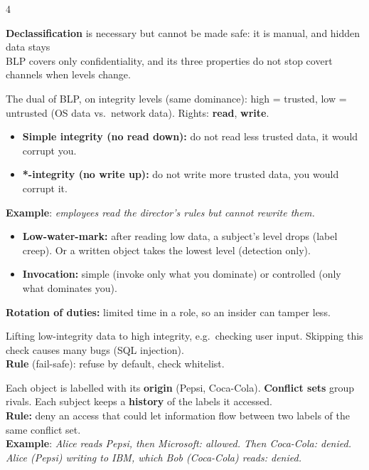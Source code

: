 \documentclass[8pt,a4paper,landscape]{extarticle}
\begin{document}
\begin{multicols*}{4}
\begin{warn}[title=Declassification and BLP limits]
    \textbf{Declassification} is necessary but cannot be made safe: it is manual, and hidden data stays\\
    BLP covers only confidentiality, and its three properties do not stop covert channels when levels change.
\end{warn}

\begin{prop}[title=Model 2 - BIBA: integrity]
    The dual of BLP, on integrity levels (same dominance): high = trusted, low = untrusted (OS data vs.\ network data). Rights: \textbf{read}, \textbf{write}.
\end{prop}

\begin{thm}[title=BIBA properties]
    \begin{itemize}
        \item \textbf{Simple integrity (no read down):} do not read less trusted data, it would corrupt you.
        \item \textbf{*-integrity (no write up):} do not write more trusted data, you would corrupt it.
    \end{itemize}
    \textbf{Example}: \textit{employees read the director's rules but cannot rewrite them.}
\end{thm}

\begin{prop}[title=BIBA variants]
    \begin{itemize}
        \item \textbf{Low-water-mark:} after reading low data, a subject's level drops (label creep). Or a written object takes the lowest level (detection only).
        \item \textbf{Invocation:} simple (invoke only what you dominate) or controlled (only what dominates you).
    \end{itemize}
    \textbf{Rotation of duties:} limited time in a role, so an insider can tamper less.
\end{prop}

\begin{defn}[title=Sanitization]
    Lifting low-integrity data to high integrity, e.g.\ checking user input. Skipping this check causes many bugs (SQL injection).\\
    \textbf{Rule} (fail-safe): refuse by default, check whitelist.
\end{defn}

\begin{prop}[title=Model 3 - Chinese Wall: conflicts of interest]
    Each object is labelled with its \textbf{origin} (Pepsi, Coca-Cola). \textbf{Conflict sets} group rivals. Each subject keeps a \textbf{history} of the labels it accessed.\\
    \textbf{Rule:} deny an access that could let information flow between two labels of the same conflict set.\\
    \textbf{Example}: \textit{Alice reads Pepsi, then Microsoft: allowed. Then Coca-Cola: denied. Alice (Pepsi) writing to IBM, which Bob (Coca-Cola) reads: denied.}
\end{prop}


\end{multicols*}
\end{document}
